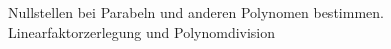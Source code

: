 \documentclass[../../main.tex]{subfiles}
\begin{document}
    Nullstellen bei Parabeln und anderen Polynomen bestimmen. Linearfaktorzerlegung und Polynomdivision
\end{document}
